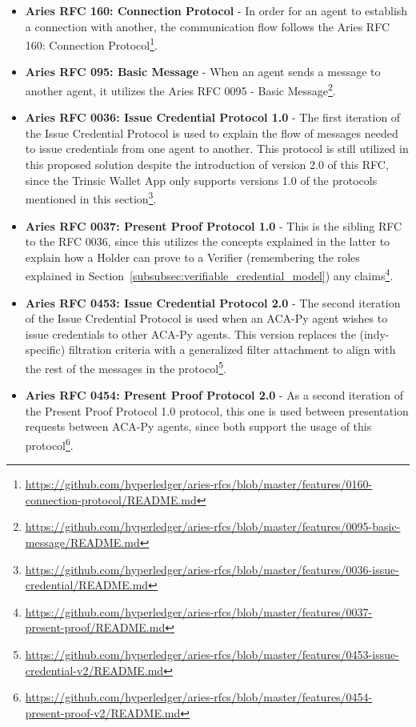 \begin{itemize}
    \item \textbf{Aries RFC 160: Connection Protocol} - In order for an agent to establish a connection with another, the communication flow follows the Aries RFC 160: Connection Protocol\footnote{\url{https://github.com/hyperledger/aries-rfcs/blob/master/features/0160-connection-protocol/README.md}}.
    \item \textbf{Aries RFC 095: Basic Message} - When an agent sends a message to another agent, it utilizes the Aries RFC 0095 - Basic Message\footnote{\url{https://github.com/hyperledger/aries-rfcs/blob/master/features/0095-basic-message/README.md}}.
    \item \textbf{Aries RFC 0036: Issue Credential Protocol 1.0} - The first iteration of the Issue Credential Protocol is used to explain the flow of messages needed to issue credentials from one agent to another. This protocol is still utilized in this proposed solution despite the introduction of version 2.0 of this RFC, since the Trinsic Wallet App only supports versions 1.0 of the protocols mentioned in this section\footnote{\url{https://github.com/hyperledger/aries-rfcs/blob/master/features/0036-issue-credential/README.md}}.
    \item \textbf{Aries RFC 0037: Present Proof Protocol 1.0} - This is the sibling RFC to the RFC 0036, since this utilizes the concepts explained in the latter to explain how a Holder can prove to a Verifier (remembering the roles explained in Section~\ref{subsubsec:verifiable_credential_model}) any claims\footnote{\url{https://github.com/hyperledger/aries-rfcs/blob/master/features/0037-present-proof/README.md}}.
    \item \textbf{Aries RFC 0453: Issue Credential Protocol 2.0} - The second iteration of the Issue Credential Protocol is used when an ACA-Py agent wishes to issue credentials to other ACA-Py agents. This version replaces the (indy-specific) filtration criteria with a generalized filter attachment to align with the rest of the messages in the protocol\footnote{\url{https://github.com/hyperledger/aries-rfcs/blob/master/features/0453-issue-credential-v2/README.md}}.
    \item \textbf{Aries RFC 0454: Present Proof Protocol 2.0} - As a second iteration of the Present Proof Protocol 1.0 protocol, this one is used between presentation requests between ACA-Py agents, since both support the usage of this protocol\footnote{\url{https://github.com/hyperledger/aries-rfcs/blob/master/features/0454-present-proof-v2/README.md}}.

\end{itemize}
